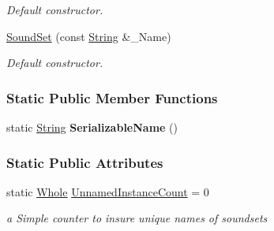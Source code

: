 \begin{DoxyCompactItemize}
\begin{DoxyCompactList}\small\item\em Default constructor. \item\end{DoxyCompactList}\item 
\hypertarget{classMezzanine_1_1Audio_1_1SoundSet_a3a93d5bc85dd3f3883d9dc9f56353e0f}{
\hyperlink{classMezzanine_1_1Audio_1_1SoundSet_a3a93d5bc85dd3f3883d9dc9f56353e0f}{SoundSet} (const \hyperlink{namespaceMezzanine_acf9fcc130e6ebf08e3d8491aebcf1c86}{String} \&\_\-Name)}
\label{classMezzanine_1_1Audio_1_1SoundSet_a3a93d5bc85dd3f3883d9dc9f56353e0f}

\begin{DoxyCompactList}\small\item\em Default constructor. \item\end{DoxyCompactList}\end{DoxyCompactItemize}
\subsubsection*{Static Public Member Functions}
\begin{DoxyCompactItemize}
\item 
\hypertarget{classMezzanine_1_1Audio_1_1SoundSet_a0eb68b7cb88dd5d4b23117e11caf3f51}{
static \hyperlink{namespaceMezzanine_acf9fcc130e6ebf08e3d8491aebcf1c86}{String} {\bfseries SerializableName} ()}
\label{classMezzanine_1_1Audio_1_1SoundSet_a0eb68b7cb88dd5d4b23117e11caf3f51}

\end{DoxyCompactItemize}
\subsubsection*{Static Public Attributes}
\begin{DoxyCompactItemize}
\item 
\hypertarget{classMezzanine_1_1Audio_1_1SoundSet_a5ad8cca8340f1bfb38d0cf6296dc7997}{
static \hyperlink{namespaceMezzanine_adcbb6ce6d1eb4379d109e51171e2e493}{Whole} \hyperlink{classMezzanine_1_1Audio_1_1SoundSet_a5ad8cca8340f1bfb38d0cf6296dc7997}{UnnamedInstanceCount} = 0}
\label{classMezzanine_1_1Audio_1_1SoundSet_a5ad8cca8340f1bfb38d0cf6296dc7997}

\begin{DoxyCompactList}\small\item\em a Simple counter to insure unique names of soundsets \item\end{DoxyCompactList}\end{DoxyCompactItemize}



